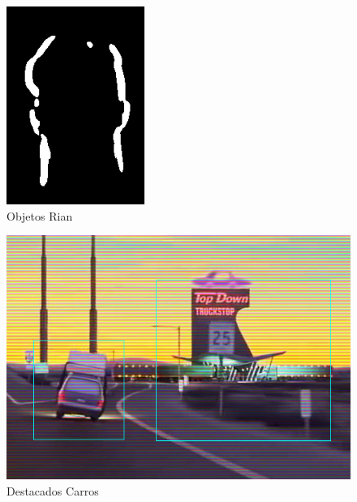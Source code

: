 \documentclass[12pt, letterpaper]{article}
\begin{document}
    \begin{figure}[h]
        \centering
        \includegraphics[width=0.4\textwidth]{objects.png}
        \\{Objetos Rian}
    \end{figure}

    \begin{figure}[h]
        \centering
        \includegraphics[width=1\textwidth]{rectangles.png}
        \\{Destacados Carros}
    \end{figure}
\end{document}
